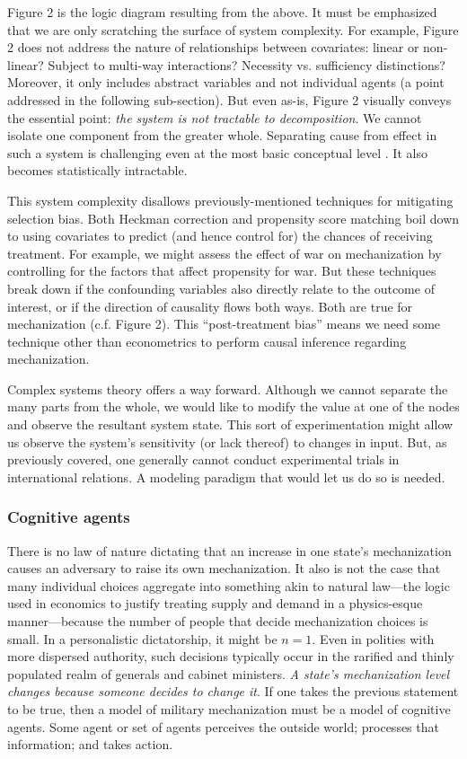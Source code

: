 \documentclass{article}
\begin{document}
Figure 2 is the logic diagram resulting from the above. It must be emphasized that we are only scratching the 
surface of system complexity. For example, Figure 2 does not address the nature of relationships 
between covariates: linear or non-linear? Subject to multi-way
interactions? Necessity vs. sufficiency distinctions? Moreover, it only includes 
abstract variables and not individual agents (a point addressed in the following
sub-section). But even as-is, Figure 2 visually conveys the essential point: \textit{the system is
not tractable to decomposition}. We cannot isolate one component from the
greater whole. Separating cause from effect in such a system is challenging even
at the most basic conceptual level
\citep{pearl2009causality}. It also becomes statistically intractable.

This system complexity disallows previously-mentioned
techniques for mitigating selection bias. Both Heckman correction and propensity score
matching boil down to using covariates to predict (and hence control for) the chances 
of receiving treatment. For example, we might assess the effect of war on
mechanization by controlling for the factors that affect propensity for war. 
But these techniques break down if the confounding variables also directly
relate to the outcome of interest, or if the direction of causality flows both
ways. Both are true for mechanization 
(c.f. Figure 2). This ``post-treatment bias'' \citep{king2010hard} means we need
some technique other than econometrics to perform causal inference regarding
mechanization.

Complex systems theory \citep[e.g.][]{simon1996sciences}
offers a way forward. Although we cannot separate the many parts from the whole,
we would like to modify the value at one of the nodes and observe the resultant system state. This sort of
experimentation might allow us observe the system's sensitivity (or lack thereof) to changes
in input. But, as previously covered, one generally cannot conduct
experimental trials in international relations.  A modeling paradigm that would let us do so is needed.

\subsubsection{Cognitive agents}

There is no law of nature dictating that an increase in one state's mechanization causes an adversary to 
raise its own mechanization. It also is not the case that many individual choices aggregate into something 
akin to natural law---the logic used 
in economics to justify treating supply and demand in a physics-esque manner---because the number of
people that decide mechanization choices is small. In a personalistic
dictatorship, it might be $n=1$. Even in polities with more dispersed authority, such decisions
typically occur in the rarified and thinly populated realm of generals and cabinet ministers. 
\textit{A state's mechanization level changes because someone decides to change it}. If one takes 
the previous statement to be true, then a model of military mechanization must be a model of 
cognitive agents.  Some agent or set of agents perceives the outside
world; processes that information; and takes action. 
\end{document}
